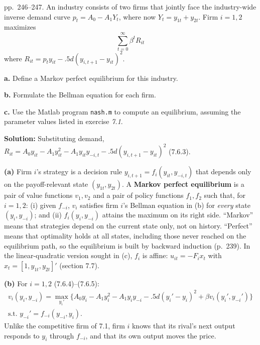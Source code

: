 \documentclass[12pt, letterpaper]{article}
\begin{document}
\begin{tcolorbox}[oddbox,title={Exercise 7.5 \quad Duopoly}]
\begin{tcolorbox}[questionbox]
pp.~246--247. An industry consists of two firms that jointly face the industry-wide inverse demand
curve $p_t=A_0-A_1Y_t$, where now $Y_t=y_{1t}+y_{2t}$. Firm $i=1,2$ maximizes
\[
\sum_{t=0}^\infty\beta^tR_{it} \tag{1}
\]
where $R_{it}=p_ty_{it}-.5d(y_{i,t+1}-y_{it})^2$.

\textbf{a.} Define a Markov perfect equilibrium for this industry.

\textbf{b.} Formulate the Bellman equation for each firm.

\textbf{c.} Use the Matlab program \texttt{nash.m} to compute an equilibrium, assuming the parameter
values listed in exercise \textit{7.1}.
\end{tcolorbox}

\textbf{Solution:} Substituting demand,
$R_{it}=A_0y_{it}-A_1y_{it}^2-A_1y_{it}y_{-i,t}-.5d(y_{i,t+1}-y_{it})^2$ (7.6.3).

\textbf{(a)} Firm $i$'s strategy is a decision rule $y_{i,t+1}=f_i(y_{it},y_{-i,t})$ that depends
only on the payoff-relevant state $(y_{1t},y_{2t})$. A \textbf{Markov perfect equilibrium} is a pair
of value functions $v_1,v_2$ and a pair of policy functions $f_1,f_2$ such that, for $i=1,2$:
(i) given $f_{-i}$, $v_i$ satisfies firm $i$'s Bellman equation in (b) for \emph{every} state
$(y_i,y_{-i})$; and (ii) $f_i(y_i,y_{-i})$ attains the maximum on its right side. ``Markov'' means
that strategies depend on the current state only, not on history. ``Perfect'' means that
optimality holds at all states, including those never reached on the equilibrium path, so the
equilibrium is built by backward induction (p.~239). In the linear-quadratic version sought in (c),
$f_i$ is affine: $u_{it}=-F_ix_t$ with $x_t=[1,y_{1t},y_{2t}]'$ (section 7.7).

\textbf{(b)} For $i=1,2$ (7.6.4)--(7.6.5):
\[
\boxed{\begin{gathered}v_i(y_i,y_{-i})=\max_{y_i'}\Big\{A_0y_i-A_1y_i^2-A_1y_iy_{-i}-.5d(y_i'-y_i)^2+\beta
v_i(y_i',y_{-i}')\Big\}\\ \text{s.t. } y_{-i}'=f_{-i}(y_{-i},y_i).\end{gathered}}
\]
Unlike the competitive firm of 7.1, firm $i$ knows that its rival's next output responds to
$y_i$ through $f_{-i}$, and that its own output moves the price.


\end{tcolorbox}
\end{document}

